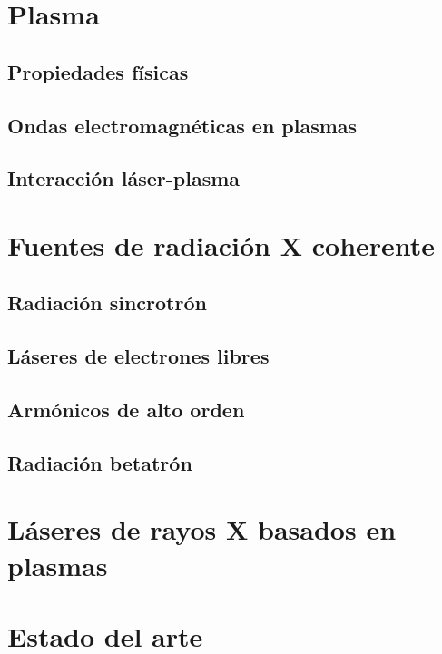 \section{Plasma}\label{sec:1.2}

\subsection{Propiedades físicas}\label{sec:1.2.1}

\subsection{Ondas electromagnéticas en plasmas}\label{sec:1.2.2}

\subsection{Interacción láser-plasma}\label{sec:1.2.3}

\section{Fuentes de radiación X coherente}\label{sec:1.3}

\subsection{Radiación sincrotrón}\label{sec:1.3.1}

\subsection{Láseres de electrones libres}\label{sec:1.3.2}

\subsection{Armónicos de alto orden}\label{sec:1.3.3}

\subsection{Radiación betatrón}\label{sec:1.3.4}

\section{Láseres de rayos X basados en plasmas}\label{sec:1.4}

\section{Estado del arte}\label{sec:1.5}
